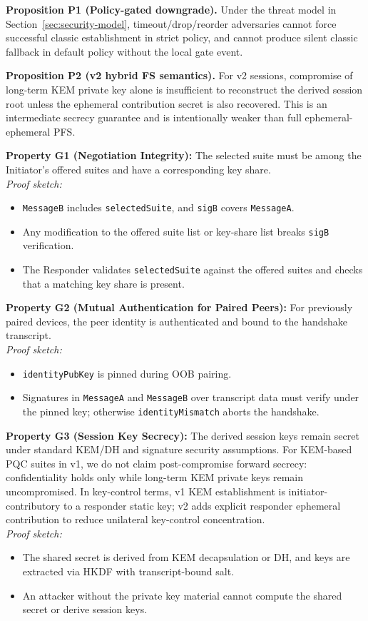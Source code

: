 \documentclass[10pt,journal,compsoc]{IEEEtran}
\providecommand{\tightlist}{%
  \setlength{\itemsep}{0pt}\setlength{\parskip}{0pt}}
\begin{document}
\textbf{Proposition P1 (Policy-gated downgrade).} Under the threat model in
Section~\ref{sec:security-model}, timeout/drop/reorder adversaries cannot
force successful classic establishment in strict policy, and cannot produce
silent classic fallback in default policy without the local gate event.

\textbf{Proposition P2 (v2 hybrid FS semantics).} For v2 sessions,
compromise of long-term KEM private key alone is insufficient to reconstruct
the derived session root unless the ephemeral contribution secret is also
recovered. This is an intermediate secrecy guarantee and is intentionally
weaker than full ephemeral-ephemeral PFS.

\textbf{Property G1 (Negotiation Integrity):} The selected suite must be
among the Initiator's offered suites and have a corresponding key
share.\\
\emph{Proof sketch:}
\begin{itemize}\tightlist
\item
  \texttt{MessageB} includes \texttt{selectedSuite}, and
  \texttt{sigB} covers \texttt{MessageA}.
\item
  Any modification to the offered suite list or key-share list breaks
  \texttt{sigB} verification.
\item
  The Responder validates \texttt{selectedSuite} against the offered
  suites and checks that a matching key share is present.
\end{itemize}

\textbf{Property G2 (Mutual Authentication for Paired Peers):} For
previously paired devices, the peer identity is authenticated and bound
to the handshake transcript.\\
\emph{Proof sketch:}
\begin{itemize}\tightlist
\item
  \texttt{identityPubKey} is pinned during OOB pairing.
\item
  Signatures in \texttt{MessageA} and \texttt{MessageB} over transcript
  data must verify under the pinned key; otherwise
  \texttt{identityMismatch} aborts the handshake.
\end{itemize}

\textbf{Property G3 (Session Key Secrecy):} The derived session keys
remain secret under standard KEM/DH and signature security
assumptions. For KEM-based PQC suites in v1, we do not claim
post-compromise forward secrecy: confidentiality holds only while
long-term KEM private keys remain uncompromised. In key-control terms,
v1 KEM establishment is initiator-contributory to a responder static
key; v2 adds explicit responder ephemeral contribution to reduce
unilateral key-control concentration.\\
\emph{Proof sketch:}
\begin{itemize}\tightlist
\item
  The shared secret is derived from KEM decapsulation or DH, and keys
  are extracted via HKDF with transcript-bound salt.
\item
  An attacker without the private key material cannot compute the shared
  secret or derive session keys.
\end{itemize}
\end{document}

